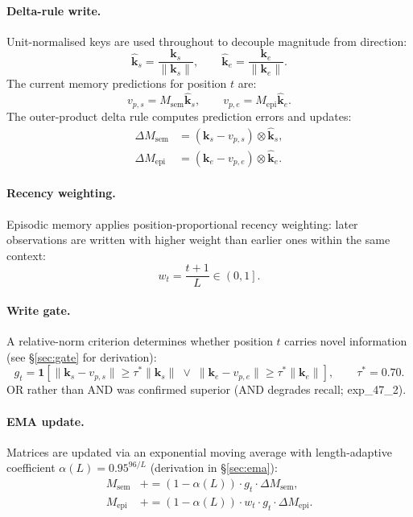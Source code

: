 \documentclass{article}
\newcommand{\Msem}{M_{\mathrm{sem}}}
\newcommand{\Mepi}{M_{\mathrm{epi}}}
\newcommand{\ks}{\mathbf{k}_s}
\newcommand{\ke}{\mathbf{k}_e}
\newcommand{\ksnorm}{\hat{\mathbf{k}}_s}
\newcommand{\kenorm}{\hat{\mathbf{k}}_e}
\newcommand{\vps}{v_{p,s}}
\newcommand{\vpe}{v_{p,e}}
\begin{document}
\paragraph{Delta-rule write.}
Unit-normalised keys are used throughout to decouple magnitude from direction:
\begin{equation}
  \ksnorm = \frac{\ks}{\|\ks\|},
  \qquad
  \kenorm = \frac{\ke}{\|\ke\|}.
\end{equation}
The current memory predictions for position $t$ are:
\begin{equation}
  \vps = \Msem \ksnorm,
  \qquad
  \vpe = \Mepi \kenorm.
\end{equation}
The outer-product delta rule computes prediction errors and updates:
\begin{align}
  \Delta\Msem &= (\ks - \vps) \otimes \ksnorm, \label{eq:delta-sem} \\
  \Delta\Mepi &= (\ke - \vpe) \otimes \kenorm. \label{eq:delta-epi}
\end{align}

\paragraph{Recency weighting.}
Episodic memory applies position-proportional recency weighting: later observations
are written with higher weight than earlier ones within the same context:
\begin{equation}
  w_t = \frac{t+1}{L} \in \left(0, 1\right].
\end{equation}

\paragraph{Write gate.}
A relative-norm criterion determines whether position $t$ carries novel information
(see \S\ref{sec:gate} for derivation):
\begin{equation}
  g_t =
  \mathbf{1}\!\left[\|\ks - \vps\| \geq \tau^* \|\ks\|
  \;\vee\;
  \|\ke - \vpe\| \geq \tau^* \|\ke\|\right],
  \qquad \tau^* = 0.70.
  \label{eq:gate}
\end{equation}
OR rather than AND was confirmed superior (AND degrades recall; exp\_47\_2).

\paragraph{EMA update.}
Matrices are updated via an exponential moving average with length-adaptive coefficient
$\alpha(L) = 0.95^{96/L}$ (derivation in \S\ref{sec:ema}):
\begin{align}
  \Msem &\mathrel{+}= (1 - \alpha(L))\cdot g_t \cdot \Delta\Msem,
  \label{eq:ema-sem} \\
  \Mepi &\mathrel{+}= (1 - \alpha(L))\cdot w_t \cdot g_t \cdot \Delta\Mepi.
  \label{eq:ema-epi}
\end{align}
\end{document}
